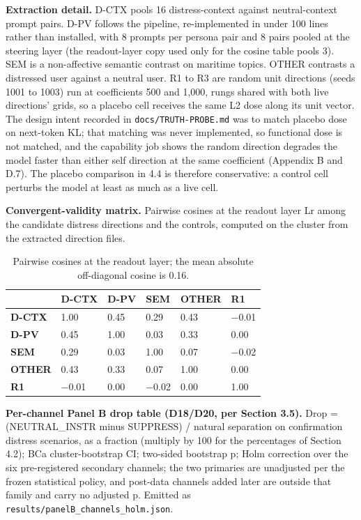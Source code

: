 \documentclass[11pt,a4paper]{article}
\newcommand{\pnum}[2]{#2}
\begin{document}
\textbf{Extraction detail.} D-CTX pools 16 distress-context against neutral-context prompt pairs. D-PV follows the \citet{chen2025persona} pipeline, re-implemented in under 100 lines rather than installed, with 8 prompts per persona pair and 8 pairs pooled at the steering layer (the readout-layer copy used only for the cosine table pools 3). SEM is a non-affective semantic contrast on maritime topics. OTHER contrasts a distressed user against a neutral user. R1 to R3 are random unit directions (seeds 1001 to 1003) run at coefficients 500 and 1,000, rungs shared with both live directions' grids, so a placebo cell receives the same L2 dose along its unit vector. The design intent recorded in \texttt{docs/TRUTH-PROBE.md} was to match placebo dose on next-token KL; that matching was never implemented, so functional dose is not matched, and the capability job shows the random direction degrades the model faster than either self direction at the same coefficient (Appendix B and D.7). The placebo comparison in 4.4 is therefore conservative: a control cell perturbs the model at least as much as a live cell.

\textbf{Convergent-validity matrix.} Pairwise cosines at the readout layer Lr among the candidate distress directions and the controls, computed on the cluster from the extracted direction files.

\begin{table}[!ht]
\centering\small
\caption{Pairwise cosines at the readout layer; the mean absolute off-diagonal cosine is \pnum{cos}{0.16}.}
\begin{tabularx}{\linewidth}{lYYYYY}
\toprule
 & \textbf{D-CTX} & \textbf{D-PV} & \textbf{SEM} & \textbf{OTHER} & \textbf{R1} \\
\midrule
\textbf{D-CTX} & 1.00 & 0.45 & 0.29 & 0.43 & $-$0.01 \\
\textbf{D-PV} & 0.45 & 1.00 & 0.03 & 0.33 & 0.00 \\
\textbf{SEM} & 0.29 & 0.03 & 1.00 & 0.07 & $-$0.02 \\
\textbf{OTHER} & 0.43 & 0.33 & 0.07 & 1.00 & 0.00 \\
\textbf{R1} & $-$0.01 & 0.00 & $-$0.02 & 0.00 & 1.00 \\
\bottomrule
\end{tabularx}
\end{table}

\textbf{Per-channel Panel B drop table (D18/D20, per Section 3.5).} Drop = (NEUTRAL\_INSTR minus SUPPRESS) / natural separation on confirmation distress scenarios, as a fraction (multiply by 100 for the percentages of Section 4.2); BCa cluster-bootstrap CI; two-sided bootstrap p; Holm correction over the six pre-registered secondary channels; the two primaries are unadjusted per the frozen statistical policy, and post-data channels added later are outside that family and carry no adjusted p. Emitted as \texttt{results/\allowbreak{}panelB\_\allowbreak{}channels\_\allowbreak{}holm.json}.
\end{document}
